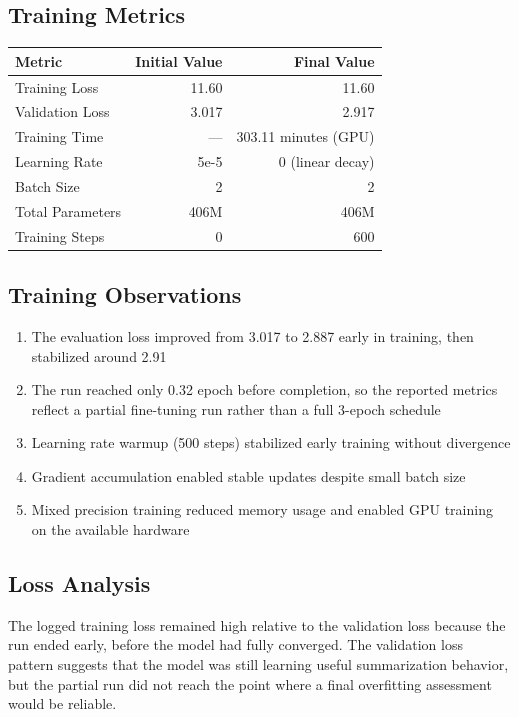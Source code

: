\documentclass[12pt,a4paper,oneside]{report}
\begin{document}
\subsection{Training Metrics}
\begin{table}[H]
\centering
\begin{tabular}{lrr}
\toprule
\textbf{Metric} & \textbf{Initial Value} & \textbf{Final Value} \\
\midrule
Training Loss & 11.60 & 11.60 \\
Validation Loss & 3.017 & 2.917 \\
Training Time & --- & 303.11 minutes (GPU) \\
Learning Rate & 5e-5 & 0 (linear decay) \\
Batch Size & 2 & 2 \\
Total Parameters & 406M & 406M \\
Training Steps & 0 & 600 \\
\bottomrule
\end{tabular}
\end{table}

\subsection{Training Observations}
\begin{enumerate}
    \item The evaluation loss improved from 3.017 to 2.887 early in training, then stabilized around 2.91
    \item The run reached only 0.32 epoch before completion, so the reported metrics reflect a partial fine-tuning run rather than a full 3-epoch schedule
    \item Learning rate warmup (500 steps) stabilized early training without divergence
    \item Gradient accumulation enabled stable updates despite small batch size
    \item Mixed precision training reduced memory usage and enabled GPU training on the available hardware
\end{enumerate}

\subsection{Loss Analysis}
The logged training loss remained high relative to the validation loss because the run ended early, before the model had fully converged. The validation loss pattern suggests that the model was still learning useful summarization behavior, but the partial run did not reach the point where a final overfitting assessment would be reliable.
\end{document}
